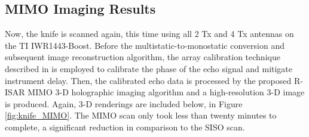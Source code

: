 \documentclass[conference]{IEEEtran}
\begin{document}
		\subsection{MIMO Imaging Results}
		
		Now, the knife is scanned again, this time using all 2 Tx and 4 Tx antennas on the TI IWR1443-Boost. Before the multistatic-to-monostatic conversion and subsequent image reconstruction algorithm, the array calibration technique described in \cite{Yanik:NearFieldMIMOSAR} is employed to calibrate the phase of the echo signal and mitigate instrument delay. Then, the calibrated echo data is processed by the proposed R-ISAR MIMO 3-D holographic imaging algorithm and a high-resolution 3-D image is produced. Again, 3-D renderings are included below, in Figure \ref{fig:knife_MIMO}. The MIMO scan only took less than twenty minutes to complete, a significant reduction in comparison to the SISO scan.
		
\end{document}
